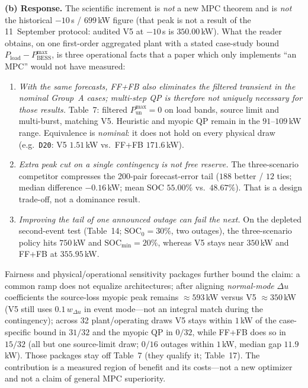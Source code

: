 \documentclass[11pt]{article}
\begin{document}
\textbf{(b) Response.} The scientific increment is \emph{not} a new MPC theorem and is \emph{not} the historical $-10$\,s / $699$\,kW figure (that peak is not a result of the 11~September protocol: audited V5 at $-10$\,s is $350.00$\,kW). What the reader obtains, on one first-order aggregated plant with a stated case-study bound $P_{\mathrm{load}}-P_{\mathrm{BESS}}^{\max}$, is three operational facts that a paper which only implements ``an MPC'' would not have measured:

\begin{enumerate}
\item \emph{With the same forecasts, FF+FB also eliminates the filtered transient in the \emph{nominal} Group~A cases; multi-step QP is therefore not uniquely necessary for those results.} Table~7: filtered $P_{\mathrm{un}}^{\max}=0$ on load bands, source limit and multi-burst, matching V5. Heuristic and myopic QP remain in the $91$--$109$\,kW range. Equivalence is \emph{nominal}: it does not hold on every physical draw (e.g.\ \texttt{D20}: V5 $1.51$\,kW vs.\ FF+FB $171.6$\,kW).
\item \emph{Extra peak cut on a single contingency is not free reserve.} The three-scenario competitor compresses the 200-pair forecast-error tail ($188$ better / $12$ ties; median difference $-0.16$\,kW; mean SOC $55.00\%$ vs.\ $48.67\%$). That is a design trade-off, not a dominance result.
\item \emph{Improving the tail of one announced outage can fail the next.} On the depleted second-event test (Table~14; $\mathrm{SOC}_0=30\%$, two outages), the three-scenario policy hits $750$\,kW and $\mathrm{SOC}_{\min}=20\%$, whereas V5 stays near $350$\,kW and FF+FB at $355.95$\,kW.
\end{enumerate}

Fairness and physical/operational sensitivity packages further bound the claim: a common ramp does not equalize architectures; after aligning \emph{normal-mode} $\Delta u$ coefficients the source-loss myopic peak remains $\approx 593$\,kW versus V5 $\approx 350$\,kW (V5 still uses $0.1\,w_{\Delta u}$ in event mode---not an integral match during the contingency); across 32 plant/operating draws V5 stays within $1$\,kW of the case-specific bound in $31/32$ and the myopic QP in $0/32$, while FF+FB does so in $15/32$ (all but one source-limit draw; $0/16$ outages within $1$\,kW, median gap $11.9$\,kW). Those packages stay off Table~7 (they qualify it; Table~17). The contribution is a measured region of benefit and its costs---not a new optimizer and not a claim of general MPC superiority.
\end{document}
